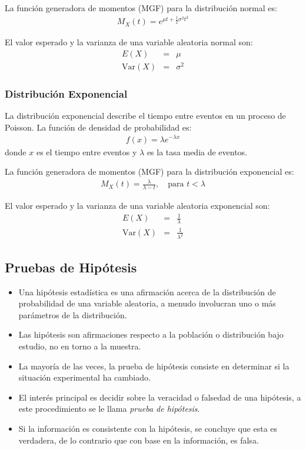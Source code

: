 \documentclass[a4paper]{report} %
\begin{document}
La funci\'on generadora de momentos (MGF) para la distribuci\'on normal es:
\begin{eqnarray*}
M_X(t) = e^{\mu t + \frac{1}{2} \sigma^2 t^2}
\end{eqnarray*}

El valor esperado y la varianza de una variable aleatoria normal son:
\begin{eqnarray*}
E(X) &=& \mu \\
\text{Var}(X) &=& \sigma^2
\end{eqnarray*}

\subsubsection{Distribuci\'on Exponencial}

La distribuci\'on exponencial describe el tiempo entre eventos en un proceso de Poisson. La funci\'on de densidad de probabilidad es:
\begin{eqnarray*}
f(x) = \lambda e^{-\lambda x}
\end{eqnarray*}
donde $x$ es el tiempo entre eventos y $\lambda$ es la tasa media de eventos.

La funci\'on generadora de momentos (MGF) para la distribuci\'on exponencial es:
\begin{eqnarray*}
M_X(t) = \frac{\lambda}{\lambda - t}, \quad \text{para } t < \lambda
\end{eqnarray*}

El valor esperado y la varianza de una variable aleatoria exponencial son:
\begin{eqnarray*}
E(X) &=& \frac{1}{\lambda} \\
\text{Var}(X) &=& \frac{1}{\lambda^2}
\end{eqnarray*}



\subsection{Pruebas de Hip\'otesis}

\begin{itemize}
    \item Una hip\'otesis estad\'istica es una afirmaci\'on acerca de la distribuci\'on de probabilidad de una variable aleatoria, a menudo involucran uno o m\'as par\'ametros de la distribuci\'on.
    \item Las hip\'otesis son afirmaciones respecto a la poblaci\'on o distribuci\'on bajo estudio, no en torno a la muestra.
    \item La mayor\'ia de las veces, la prueba de hip\'otesis consiste en determinar si la situaci\'on experimental ha cambiado.
    \item El inter\'es principal es decidir sobre la veracidad o falsedad de una hip\'otesis, a este procedimiento se le llama \textit{prueba de hip\'otesis}.
    \item Si la informaci\'on es consistente con la hip\'otesis, se concluye que esta es verdadera, de lo contrario que con base en la informaci\'on, es falsa.
\end{itemize}
\end{document}
